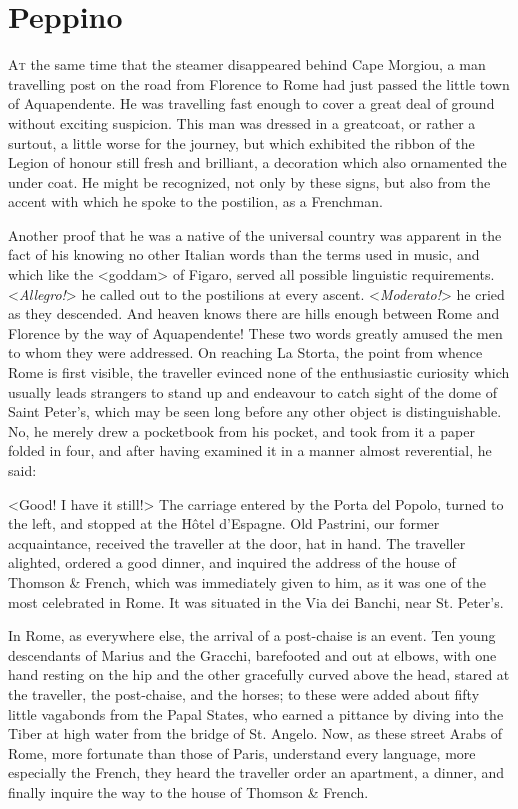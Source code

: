 \chapter{Peppino} 

 \lettrine{A}{t} the same time that the steamer disappeared behind Cape Morgiou, a man travelling post on the road from Florence to Rome had just passed the little town of Aquapendente. He was travelling fast enough to cover a great deal of ground without exciting suspicion. This man was dressed in a greatcoat, or rather a surtout, a little worse for the journey, but which exhibited the ribbon of the Legion of honour still fresh and brilliant, a decoration which also ornamented the under coat. He might be recognized, not only by these signs, but also from the accent with which he spoke to the postilion, as a Frenchman. 

 Another proof that he was a native of the universal country was apparent in the fact of his knowing no other Italian words than the terms used in music, and which like the <goddam> of Figaro, served all possible linguistic requirements. <\textit{Allegro!}> he called out to the postilions at every ascent. <\textit{Moderato!}> he cried as they descended. And heaven knows there are hills enough between Rome and Florence by the way of Aquapendente! These two words greatly amused the men to whom they were addressed. On reaching La Storta, the point from whence Rome is first visible, the traveller evinced none of the enthusiastic curiosity which usually leads strangers to stand up and endeavour to catch sight of the dome of Saint Peter's, which may be seen long before any other object is distinguishable. No, he merely drew a pocketbook from his pocket, and took from it a paper folded in four, and after having examined it in a manner almost reverential, he said: 

 <Good! I have it still!>  The carriage entered by the Porta del Popolo, turned to the left, and stopped at the Hôtel d'Espagne. Old Pastrini, our former acquaintance, received the traveller at the door, hat in hand. The traveller alighted, ordered a good dinner, and inquired the address of the house of Thomson \& French, which was immediately given to him, as it was one of the most celebrated in Rome. It was situated in the Via dei Banchi, near St. Peter's. 

 In Rome, as everywhere else, the arrival of a post-chaise is an event. Ten young descendants of Marius and the Gracchi, barefooted and out at elbows, with one hand resting on the hip and the other gracefully curved above the head, stared at the traveller, the post-chaise, and the horses; to these were added about fifty little vagabonds from the Papal States, who earned a pittance by diving into the Tiber at high water from the bridge of St. Angelo. Now, as these street Arabs of Rome, more fortunate than those of Paris, understand every language, more especially the French, they heard the traveller order an apartment, a dinner, and finally inquire the way to the house of Thomson \& French. 

